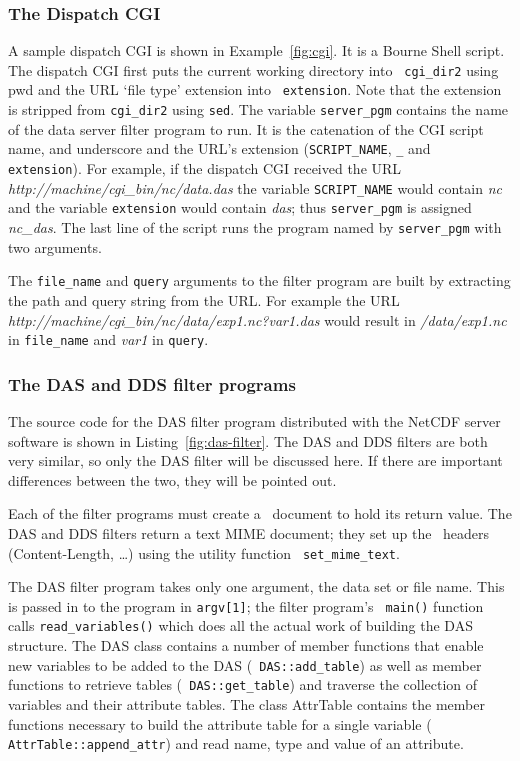 \subsubsection{The Dispatch CGI}
\label{tk:cgi}

A sample dispatch CGI is shown in Example~\ref{fig:cgi}. It is a Bourne Shell
script.  The dispatch CGI first puts the current working directory into {\tt
  cgi\_dir2} using pwd and the URL `file type' extension into {\tt
  extension}. Note that the extension is stripped from {\tt cgi\_dir2} using
{\tt sed}. The variable {\tt server\_pgm} contains the name of the data
server filter program to run. It is the catenation of the CGI script name,
and underscore and the URL's extension ({\tt SCRIPT\_NAME}, {\tt \_} and {\tt
  extension}). For example, if the dispatch CGI received the URL {\em
  http://machine/cgi\_bin/nc/data.das\/} the variable {\tt SCRIPT\_NAME}
would contain {\em nc\/} and the variable {\tt extension} would contain {\em
  das\/}; thus {\tt server\_pgm} is assigned {\em nc\_das\/}.  The last line
of the script runs the program named by {\tt server\_pgm} with two arguments.

The {\tt file\_name} and {\tt query} arguments to the filter program are
built by extracting the path and query string from the URL. For example the
URL {\em http://machine/cgi\_bin/nc/data/exp1.nc?var1.das\/} would result in
{\em /data/exp1.nc\/} in {\tt file\_name} and {\em var1\/} in {\tt query}.

\subsubsection{The DAS and DDS filter programs}

The source code for the DAS filter program distributed with the NetCDF server
software is shown in Listing~\ref{fig:das-filter}. The DAS and DDS filters
are both very similar, so only the DAS filter will be discussed here. If
there are important differences between the two, they will be pointed out.

Each of the filter programs must create a \MIME\ document to hold its return
value. The DAS and DDS filters return a text MIME document; they set up the
\MIME\ headers (Content-Length, \ldots) using the utility function {\tt
  set\_mime\_text}. 

The DAS filter program takes only one argument, the data set or file name.
This is passed in to the program in {\tt argv[1]}; the filter program's {\tt
  main()} function calls {\tt read\_variables()} which does all the actual
work of building the DAS structure. The DAS class contains a number of member
functions that enable new variables to be added to the DAS ({\tt
  DAS::add\_table}) as well as member functions to retrieve tables ({\tt
  DAS::get\_table}) and traverse the collection of variables and their
attribute tables. The class AttrTable contains the member functions necessary
to build the attribute table for a single variable ({\tt
  AttrTable::append\_attr}) and read name, type and value of an attribute.

